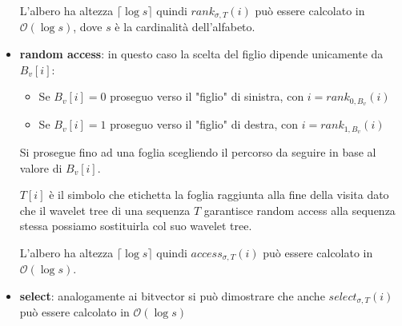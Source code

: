 \begin{itemize}
          L'albero ha altezza $\lceil \log s\rceil$ quindi $rank_{\sigma,T} (i)$
          può essere calcolato in $\mathcal{O}(\log s)$, dove $s$ è la cardinalità
          dell'alfabeto.
    \item \textbf{random access}: in questo caso la scelta del figlio dipende
          unicamente da $B_v [i]$:
          \begin{itemize}
              \item Se $B_v [i] = 0$ proseguo verso il "figlio" di sinistra,
                    con $i = rank_{0,B_v}(i)$
              \item Se $B_v [i] = 1$ proseguo verso il "figlio" di destra,
                    con $i = rank_{1,B_v}(i)$
          \end{itemize}
          Si prosegue fino ad una foglia scegliendo il percorso da seguire in
          base al valore di $B_v [i]$.

          $T[i]$ è il simbolo che etichetta la foglia raggiunta alla fine della
          visita dato che il wavelet tree di una sequenza $T$ garantisce random
          access alla sequenza stessa possiamo sostituirla col suo wavelet tree.

          L'albero ha altezza $\lceil\log s \rceil$ quindi $access_{\sigma,T} (i)$
          può essere calcolato in $\mathcal{O}(\log s)$.
    \item \textbf{select}: analogamente ai bitvector si può dimostrare che anche
          $select_{\sigma,T}(i)$ può essere calcolato in $\mathcal{O}(\log s)$
\end{itemize}
